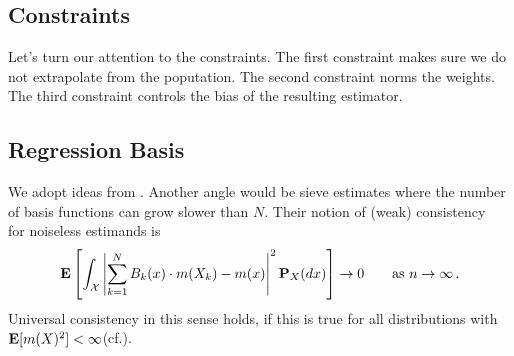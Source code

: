 \subsection*{Constraints}
Let's turn our attention to the constraints.
The first constraint makes sure we do not extrapolate from the poputation.
The second constraint norms the weights. 
The third constraint controls the bias of the resulting estimator.
\subsection*{Regression Basis}
We adopt ideas from \cite{Gyorfi2002}. Another angle would be sieve estimates\cite{Newey1997a} where the number of basis functions can grow slower than $N$.
Their notion of (weak) consistency~\cite[Definitien~1.1]{Gyorfi2002} for noiseless estimands
is
\begin{gather}
  \E
  \left[ 
    \int_\mathcal{X}
    \left| 
    \sum_{k=1}^{N} 
    B_k(x)
    \cdot
    m(X_k)
    -
    m(x)
    \right|
    ^2
    \P_X(dx)
  \right]
  \to
  0
  \qquad
  \text{as}
  \ 
  n\to \infty
  \,.
\end{gather}
Universal consistency in this sense holds, if this is true for all distributions with
$\mathbf{E}[m(X)^2]<\infty$(cf.\cite[Definition~1.3]{Gyorfi2002}).

